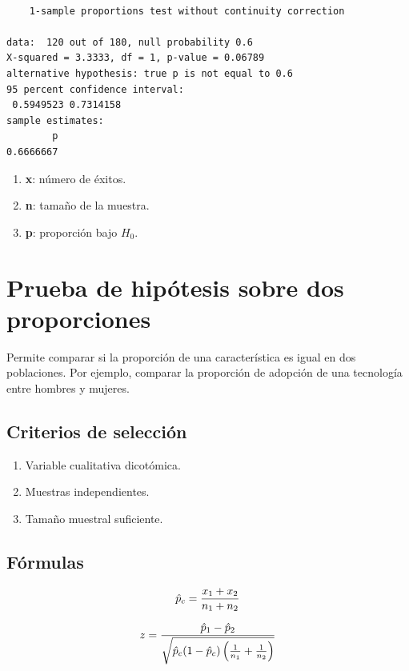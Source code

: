 \documentclass[
  spanish,
  letterpaper,
]{book}
\begin{document}
\begin{verbatim}

    1-sample proportions test without continuity correction

data:  120 out of 180, null probability 0.6
X-squared = 3.3333, df = 1, p-value = 0.06789
alternative hypothesis: true p is not equal to 0.6
95 percent confidence interval:
 0.5949523 0.7314158
sample estimates:
        p 
0.6666667 
\end{verbatim}

\begin{enumerate}
\def\labelenumi{\arabic{enumi}.}
\item
  \textbf{x}: número de éxitos.
\item
  \textbf{n}: tamaño de la muestra.
\item
  \textbf{p}: proporción bajo \(H_0\)\hspace{0pt}.
\end{enumerate}

\section{Prueba de hipótesis sobre dos
proporciones}\label{prueba-de-hipuxf3tesis-sobre-dos-proporciones}

Permite comparar si la proporción de una característica es igual en dos
poblaciones. Por ejemplo, comparar la proporción de adopción de una
tecnología entre hombres y mujeres.

\subsection{Criterios de selección}\label{criterios-de-selecciuxf3n-3}

\begin{enumerate}
\def\labelenumi{\arabic{enumi}.}
\item
  Variable cualitativa dicotómica.
\item
  Muestras independientes.
\item
  Tamaño muestral suficiente.
\end{enumerate}

\subsection{Fórmulas}\label{fuxf3rmulas-2}

\[\huge \hat{p}_c = \frac{x_1 + x_2}{n_1 + n_2}\]

\[\LARGE z = \frac{\hat{p}_1 - \hat{p}_2}{\sqrt{\hat{p}_c(1-\hat{p}_c)\left(\frac{1}{n_1} + \frac{1}{n_2}\right)}}\]
\end{document}
